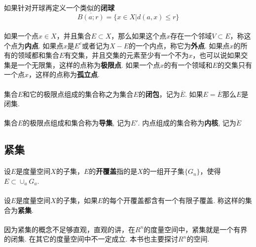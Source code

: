 \paragraph{}
如果针对开球再定义一个类似的\textbf{闭球}
$$
\overline{B(a; r)} = \{ x\in X| d(a, x) \leq r\}
$$

\paragraph{}
如果一个点$x \in X$，并且集合$E \subset X$，那么如果这个点$x$存在一个邻域$V \subset E$，称这个点为\textbf{内点}. 如果点$x$是$E^c$或者记为$X - E$的一个内点，称它为\textbf{外点}.  如果点$x$的所有的领域都和集合$E$有交集，并且交集的元素至少有一个不为$x$，也可以说如果交集是一个无限集，这样的点称为\textbf{极限点}. 如果一个点$x$的有一个领域和$E$的交集只有一个点$x$，这样的点称为\textbf{孤立点}.

\paragraph{}
集合$E$和它的极限点组成的集合称之为集合$E$的\textbf{闭包}，记为$\overline{E}$. 如果$E = \overline{E}$那么$E$是闭集.

\paragraph{}
集合$E$的极限点组成和集合称为\textbf{导集}, 记为$E'$. 内点组成的集合称为\textbf{内核}, 记为$\mathring{E}$


\subsection{紧集}
\paragraph{}
设$E$是度量空间$X$的子集，$E$的\textbf{开覆盖}指的是$X$的一组开子集$\{G_n\}$，使得$E \subset \cup_aG_a$. 

\paragraph{}
设$E$是度量空间$X$的子集，如果$E$的每个开覆盖都含有一个有限子覆盖. 称这样的集合为\textbf{紧集}.

\paragraph{}
因为紧集的概念不足够直观，直观的讲，在$R^n$的度量空间中，紧集就是一个有界的闭集. 在其它的度量空间中不一定成立. 本书也主要探讨$R^n$的空间.








